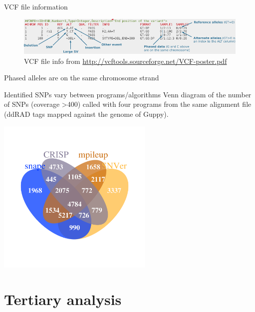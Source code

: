 \documentclass[presentation]{beamer}
\begin{document}
\begin{frame}[label=sec-3-1-16]{VCF file information}
\begin{center}

\begin{figure}[htb]
\centering
\includegraphics[width=11.5cm]{DanecekVcfFile2.png}
\caption{VCF file info from \url{http://vcftools.sourceforge.net/VCF-poster.pdf}}
\end{figure}

Phased alleles are on the same chromosome strand
 \end{center}
\end{frame}
\begin{frame}[label=sec-3-1-17]{Identified SNPs vary between programs/algorithms}
Venn diagram of the number of SNPs (coverage >400) called with four programs from the same alignment file (ddRAD tags mapped against the genome of Guppy).

\begin{center}
\includegraphics[width=7.5cm]{20150204_SNPs400DP.png}

\end{center}
\end{frame}
\section{Tertiary analysis}
\label{sec-4}
\end{document}
